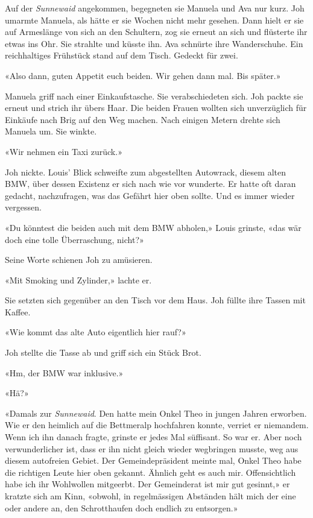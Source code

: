 \sectionbreak

Auf der \emph{Sunnewaid} angekommen, begegneten sie Manuela und Ava
nur kurz.
Joh umarmte Manuela, als hätte er sie Wochen nicht mehr gesehen. Dann
hielt er sie auf Armeslänge von sich an den Schultern, zog sie erneut an
sich und flüsterte ihr etwas ins Ohr. Sie strahlte und küsste ihn. Ava
schnürte ihre Wanderschuhe.
Ein reichhaltiges Frühstück stand auf dem Tisch. Gedeckt für zwei.

«Also dann, guten Appetit euch beiden. Wir gehen dann mal. Bis später.»

Manuela griff nach einer Einkaufstasche. Sie verabschiedeten sich. Joh
packte sie erneut und strich ihr übers Haar. Die beiden Frauen wollten
sich unverzüglich für Einkäufe nach Brig auf den Weg machen. Nach
einigen Metern drehte sich Manuela um. Sie winkte.

«Wir nehmen ein Taxi zurück.»

Joh nickte. Louis’ Blick schweifte zum abgestellten Autowrack, diesem
alten BMW, über dessen Existenz er sich nach wie vor wunderte. Er hatte
oft daran gedacht, nachzufragen, was das Gefährt hier oben sollte. Und es
immer wieder vergessen.

«Du könntest die beiden auch mit dem BMW abholen,» Louis grinste, «das
wär doch eine tolle Überraschung, nicht?»

Seine Worte schienen Joh zu amüsieren.

«Mit Smoking und Zylinder,» lachte er.

Sie setzten sich gegenüber an den Tisch vor dem Haus. Joh füllte ihre
Tassen mit Kaffee.

«Wie kommt das alte Auto eigentlich hier rauf?»

Joh stellte die Tasse ab und griff sich ein Stück Brot.

«Hm, der BMW war inklusive.»

«Hä?»

«Damals zur \emph{Sunnewaid}. Den hatte mein Onkel Theo in jungen Jahren
erworben. Wie er den heimlich auf die Bettmeralp hochfahren konnte,
verriet er niemandem. Wenn ich ihn danach fragte, grinste er jedes Mal
süffisant. So war er. Aber noch verwunderlicher ist, dass er ihn nicht
gleich wieder wegbringen musste, weg aus diesem autofreien Gebiet. Der
Gemeindepräsident meinte mal, Onkel Theo habe die richtigen Leute hier
oben gekannt. Ähnlich geht es auch mir. Offensichtlich habe ich ihr Wohlwollen mitgeerbt. Der Gemeinderat ist mir gut gesinnt,» er kratzte sich am Kinn, «obwohl, in regelmässigen
Abständen hält mich der eine oder andere an, den Schrotthaufen doch
endlich zu entsorgen.»

